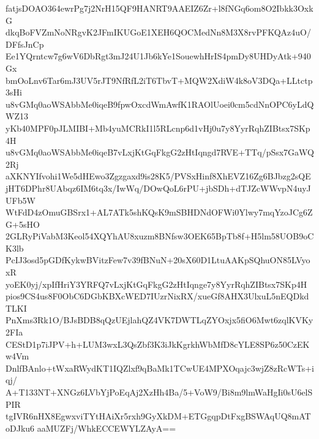fatjsDOAO364ewrPg7j2NrH15QF9HANRT9AAEIZ6Zr+l8fNGq6om8O2Ibkk3OxkG
dkqBoFVZmNoNRgvK2JFmIKUGoE1XEH6QOCMedNn8M3X8rvPFKQAz4uO/DFfsJnCp
Ee1YQrntcw7g6wV6DbRgt3mJ24U1Jb6kYe1SouewhHrIS4pmDy8UHDyAtk+940Gx
bmOoLnv6Tar6mJ3UV5rJT9NfRfL2iT6TbvT+MQW2XdiW4k8oV3DQa+LLtctp3sHi
u8vGMq0aoWSAbbMe0iqeB9fpwOxcdWmAwfK1RAOlUoei0cm5cdNnOPC6yLdQWZ13
yKb40MPF0pJLMIBI+Mb4yuMCRkI1l5RLcnp6d1vHj0u7y8YyrRqhZIBtsx7SKp4H
u8vGMq0aoWSAbbMe0iqeB7vLxjKtGqFkgG2zHtIqngd7RVE+TTq/pSsx7GaWQ2Rj
aXKNYIfvohi1We5dHEwo3Zgzgaxd9is28K5/PVSxHinf8XhEVZ16Zg6BJbzg2sQE
jHT6DPhr8UAbqz6IM6tq3x/IwWq/DOwQoL6rPU+jbSDh+dTJZcWWvpN4uyJUFb5W
WtFdD4zOmuGBSrx1+AL7ATk5shKQsK9mSBHDNdOFWi0Ylwy7mqYzoJCg6ZG+5sHO
2GLRyPiVabM3Keol54XQYhAU8xuzm8BNfsw3OEK65BpTb8f+H5lm58UOB9oCK3lb
PcIJ3osd5pGDfKykwBVitzFew7v39fBNuN+20sX60D1LtuAAKpSQhuON85LVyoxR
yoEK0yj/xpIfHriY3YRFQ7vLxjKtGqFkgG2zHtIqnge7y8YyrRqhZIBtsx7SKp4H
pios9CS4us8F0ObC6DGbKBXcWED7IUzrNixRX/xueGf8AHX3UlxuL5nEQDkdTLKI
PnXms3Rk1O/BJsBDB8qQzUEjlahQZ4VK7DWTLqZYOxjx5fiO6Mwt6zqlKVKy2FIa
CEStD1p7iJPV+h+LUM3wxL3QsZbf3K3iJkKgrkhWbMfD8cYLE8SP6z50CzEKw4Vm
DnlfBAnlo+tWxaRWydKT1IQZlxf9qBaMk1TCwUE4MPXOqajc3wjZ8zRcWTs+iqj/
A+T133NT+XNGz6LVbYjPoEqAj2XzHh4Ba/5+VoW9/Bi8m9lmWaHgIi0sU6elSPIR
tgIVR6nHX8EgwxviTYtHAiXr5rxh9GyXkDM+ETGgqpDtFxgBSWAqUQ8mAToDJku6
aaMUZFj/WhkECCEWYLZAyA==
